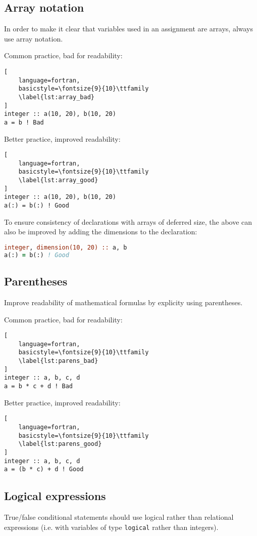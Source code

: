 \documentclass[11pt]{article}
\begin{document}
\subsection{Array notation}
In order to make it clear that variables used in an assignment are arrays, always use array notation.

Common practice, bad for readability:
\begin{lstlisting}[
	language=fortran,
    basicstyle=\fontsize{9}{10}\ttfamily
    \label{lst:array_bad}
]
integer :: a(10, 20), b(10, 20)
a = b ! Bad
\end{lstlisting}

Better practice, improved readability:
\begin{lstlisting}[
	language=fortran,
    basicstyle=\fontsize{9}{10}\ttfamily
    \label{lst:array_good}
]
integer :: a(10, 20), b(10, 20)
a(:) = b(:) ! Good
\end{lstlisting}

To ensure consistency of declarations with arrays of deferred size, the above can also be improved
by adding the dimensions to the declaration:
\begin{lstlisting}[language=fortran,basicstyle=\fontsize{9}{10}\ttfamily\label{lst:array_good_decl}
]
integer, dimension(10, 20) :: a, b
a(:) = b(:) ! Good
\end{lstlisting}

\subsection{Parentheses}
Improve readability of mathematical formulas by explicity using parentheses.

Common practice, bad for readability:
\begin{lstlisting}[
	language=fortran,
    basicstyle=\fontsize{9}{10}\ttfamily
    \label{lst:parens_bad}
]
integer :: a, b, c, d
a = b * c + d ! Bad
\end{lstlisting}

Better practice, improved readability:
\begin{lstlisting}[
	language=fortran,
    basicstyle=\fontsize{9}{10}\ttfamily
    \label{lst:parens_good}
]
integer :: a, b, c, d
a = (b * c) + d ! Good
\end{lstlisting}

\subsection{Logical expressions}
True/false conditional statements should use logical rather than relational expressions (i.e. with variables of 
type \texttt{logical} rather than integers). 
\end{document}
